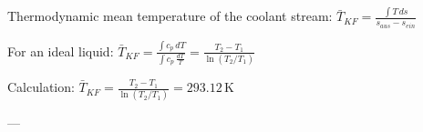Thermodynamic mean temperature of the coolant stream:  
\( \bar{T}_{KF} = \frac{\int T \, ds}{s_{aus} - s_{ein}} \)  

For an ideal liquid:  
\( \bar{T}_{KF} = \frac{\int c_p \, dT}{\int c_p \, \frac{dT}{T}} = \frac{T_2 - T_1}{\ln(T_2 / T_1)} \)  

Calculation:  
\( \bar{T}_{KF} = \frac{T_2 - T_1}{\ln(T_2 / T_1)} = 293.12 \, \text{K} \)  

---